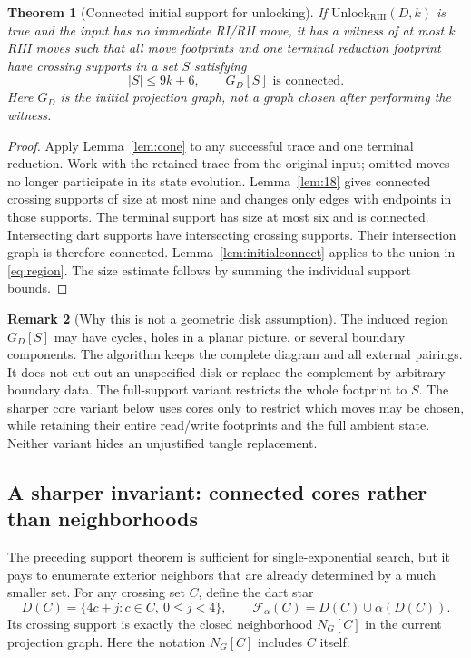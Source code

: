 \documentclass[11pt]{article}
\newtheorem{theorem}{Theorem}[section]
\theoremstyle{definition}
\newtheorem{remark}[theorem]{Remark}
\newcommand{\RIII}{\mathrm{RIII}}
\begin{document}
\begin{theorem}[Connected initial support for unlocking]
\label{thm:connectedcone}
If $\mathrm{Unlock}_{\RIII}(D,k)$ is true and the input has no immediate
RI/RII move, it has a witness of at most $k$ RIII moves such that all
move footprints and one terminal reduction footprint have crossing
supports in a set $S$ satisfying
\[
 |S|\le9k+6,\qquad G_D[S]\text{ is connected}.
\]
Here $G_D$ is the initial projection graph, not a graph chosen after
performing the witness.
\end{theorem}

\begin{proof}
Apply Lemma~\ref{lem:cone} to any successful trace and one terminal
reduction. Work with the retained trace from the original input; omitted
moves no longer participate in its state evolution. Lemma~\ref{lem:18}
gives connected crossing supports of size at most nine and changes only
edges with endpoints in those supports. The terminal support has size at
most six and is connected. Intersecting dart supports have intersecting
crossing supports. Their intersection graph is therefore connected.
Lemma~\ref{lem:initialconnect} applies to the union in \eqref{eq:region}.
The size estimate follows by summing the individual support bounds.
\end{proof}

\begin{remark}[Why this is not a geometric disk assumption]
The induced region $G_D[S]$ may have cycles, holes in a planar picture,
or several boundary components. The algorithm keeps the complete diagram
and all external pairings. It does not cut out an unspecified disk or
replace the complement by arbitrary boundary data. The full-support
variant restricts the whole footprint to $S$. The sharper core variant
below uses cores only to restrict which moves may be chosen, while
retaining their entire read/write footprints and the full ambient state.
Neither variant hides an unjustified tangle replacement.
\end{remark}


\subsection{A sharper invariant: connected cores rather than neighborhoods}
\label{sec:cores}

The preceding support theorem is sufficient for single-exponential search,
but it pays to enumerate exterior neighbors that are already determined
by a much smaller set. For any crossing set $C$, define the dart star
\[
 D(C)=\{4c+j:c\in C,\ 0\le j<4\},\qquad
 \mathcal F_\alpha(C)=D(C)\cup\alpha(D(C)).
\]
Its crossing support is exactly the closed neighborhood $N_G[C]$ in the
current projection graph. Here the notation $N_G[C]$ includes $C$ itself.
\end{document}

